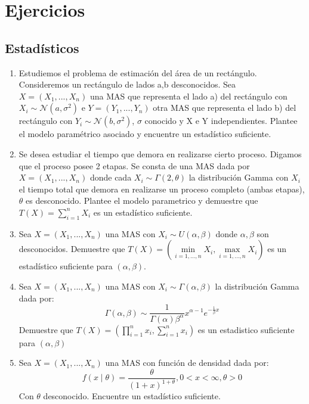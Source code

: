 \chapter{Ejercicios}

\section{Estadísticos}

\begin{enumerate}
    \item Estudiemos el problema de estimación del área de un rectángulo. Consideremos un rectángulo de lados a,b desconocidos. Sea $X=(X_1,...,X_n)$ una MAS que representa el lado a) del rectángulo con $X_i\sim \mathcal{N}(a,\sigma^2)$ e $Y=(Y_1,...,Y_n)$ otra MAS que representa el lado b) del rectángulo con $Y_i\sim \mathcal{N}(b,\sigma^2)$, $\sigma$ conocido y X e Y independientes. Plantee el modelo paramétrico asociado y encuentre un estadístico suficiente. 
    \item Se desea estudiar el tiempo que demora en realizarse cierto proceso. Digamos que el proceso posee 2 etapas. Se consta de una MAS dada por $X=(X_1,...,X_n)$ donde cada $X_i\sim \Gamma(2,\theta)$ la distribución Gamma con $X_i$ el tiempo total que demora en realizarse un proceso completo (ambas etapas), $\theta$ es desconocido. Plantee el modelo parametrico y demuestre que $T(X)=\sum\limits_{i=1}^{n}X_i$ es un estadístico suficiente.
    
    \item Sea $X=(X_1,...,X_n)$ una MAS con $X_i\sim U(\alpha,\beta)$ donde $\alpha,\beta$ son desconocidos. Demuestre que $T(X)=\left(\min\limits_{i=1,...,n}{X_i},\max\limits_{i=1,...,n}{X_i}\right)$ es un estadístico suficiente para $(\alpha,\beta)$.
    
    \item Sea $X=(X_1,...,X_n)$ una MAS con $X_i\sim \Gamma(\alpha,\beta)$ la distribución Gamma dada por:
    \begin{equation}
        \nonumber 
        \Gamma(\alpha,\beta)\sim \frac{1}{\Gamma(\alpha)\beta^\alpha}x^{\alpha-1}e^{-\frac{1}{\beta}x}
    \end{equation}
    Demuestre que $T(X)=\left (\prod\limits_{i=1}^{n}x_i,\sum\limits_{i=1}^{n}x_i  \right )$ es un estadistico suficiente para $(\alpha,\beta)$
    
    \item Sea $X=(X_1,...,X_n)$ una MAS con función de densidad dada por:
    \begin{equation}
        \nonumber 
        f(x\mid \theta)=\frac{\theta}{(1+x)^{1+\theta}} , 0<x<\infty,\theta>0
    \end{equation}
    Con $\theta$ desconocido. Encuentre un estadístico suficiente.
    

\end{enumerate}
